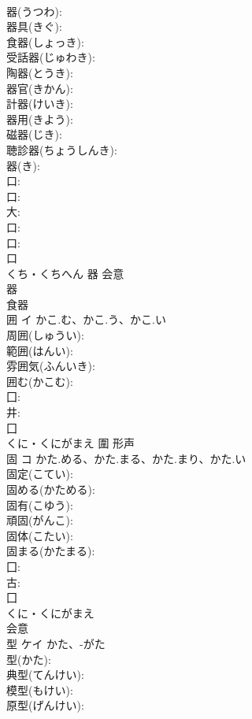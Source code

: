\documentclass[8pt]{extreport}
\begin{document}
\begin{CJK}{UTF8}{min}
\\	器(うつわ): 
\\	器具(きぐ): 
\\	食器(しょっき): 
\\	受話器(じゅわき): 
\\	陶器(とうき): 
\\	器官(きかん): 
\\	計器(けいき): 
\\	器用(きよう): 
\\	磁器(じき): 
\\	聴診器(ちょうしんき): 
\\	器(き): 
\\	口: 
\\	口: 
\\	大: 
\\	口: 
\\	口: 
\\	口	
\\	くち・くちへん	器	会意 
\\	器 
\\	食器 
\\	囲	イ	かこ.む、かこ.う、かこ.い		
\\	周囲(しゅうい): 
\\	範囲(はんい): 
\\	雰囲気(ふんいき): 
\\	囲む(かこむ): 
\\	囗: 
\\	井: 
\\	囗	
\\	くに・くにがまえ	圍	形声 
\\	固	コ	かた.める、かた.まる、かた.まり、かた.い		
\\	固定(こてい): 
\\	固める(かためる): 
\\	固有(こゆう): 
\\	頑固(がんこ): 
\\	固体(こたい): 
\\	固まる(かたまる): 
\\	囗: 
\\	古: 
\\	囗	
\\	くに・くにがまえ	
\\	会意 
\\	型	ケイ	かた、-がた		
\\	型(かた): 
\\	典型(てんけい): 
\\	模型(もけい): 
\\	原型(げんけい): 

\end{CJK}
\end{document}
